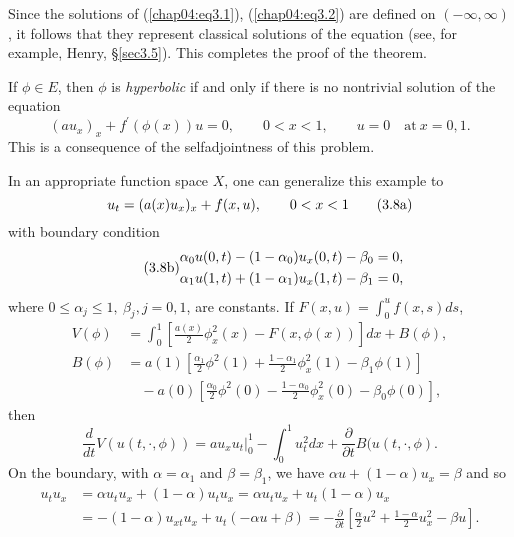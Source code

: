 \documentclass{surv-l}
\theoremstyle{plain}
\theoremstyle{definition}
\numberwithin{equation}{section}
\numberwithin{figure}{chapter}
\begin{document}
Since the solutions of (\ref{chap04:eq3.1}), (\ref{chap04:eq3.2}) are defined on $(-\infty, \infty)$, it follows that they represent classical solutions of the equation (see, for example, Henry, \S\ref{sec3.5}). This completes the proof of the theorem.

If $\phi \in E$, then $\phi$ is \emph{hyperbolic} if and only if there is no nontrivial solution of the equation
\begin{equation*}
(au_{x})_{x}+f^{\prime}(\phi(x))u=0,\qquad 0<x<1,\qquad u=0\quad \mathrm{at}\ x=0,1.
\end{equation*}
This is a consequence of the selfadjointness of this problem.

In an appropriate function space $X$, one can generalize this example to
\begin{equation}\label{chap04:eq3.8a}
u_{t}=(a(x)u_{x})_{x}+f(x, u),\qquad 0<x<1\tag{$3.8\mathrm{a}$}
\end{equation}
with boundary condition
\begin{equation}\label{chap04:eq3.8b}\tag{$3.8\mathrm{b}$}
\begin{split}
&\alpha_{0}u(0, t)-(1-\alpha_{0})u_{x}(0, t)-\beta_{0}=0,\\
&\alpha_{1}u(1, t)+(1-\alpha_{1})u_{x}(1, t)-\beta_{1}=0,
\end{split}
\end{equation}
where $0\leq\alpha_{j}\leq 1,\ \beta_{j},j=0,1$, are constants. If
$F(x, u)=\int_{0}^{u}f(x, s) ds$,
\begin{align*}
V(\phi)&=\int_{0}^{1}\left[\frac{a(x)}{2}\phi_{x}^{2}(x)-F(x, \phi(x))\right]dx+B(\phi),\\
B(\phi)&=a(1)\left[\frac{\alpha_{1}}{2}\phi^{2}(1)+\frac{1-\alpha_{1}}{2}\phi_{x}^{2}(1)-\beta_{1}\phi(1)\right]\\
&\quad-a(0)\left[\frac{\alpha_{0}}{2}\phi^{2}(0)-\frac{1-\alpha_{0}}{2}\phi_{x}^{2}(0)-\beta_{0}\phi(0)\right],
\end{align*}
then
\begin{equation*}
\frac{d}{dt}V(u(t, \cdot, \phi))=au_{x}u_{t}|_{0}^{1}-\int_{0}^{1}u_{t}^{2}dx+\frac{\partial}{\partial t}B(u(t, \cdot, \phi).
\end{equation*}
On the boundary, with $\alpha=\alpha_{1}$ and $\beta=\beta_{1}$, we have $\alpha u+(1-\alpha)u_{x}=\beta$ and so
\begin{align*}
u_{t}u_{x}&=\alpha u_{t}u_{x}+(1-\alpha)u_{t}u_{x}=\alpha u_{t}u_{x}+u_{t}(1-\alpha)u_{x}\\
\quad&=-(1-\alpha)u_{xt}u_{x}+u_{t}(-\alpha u+\beta)=-\frac{\partial}{\partial t}\left[\frac{\alpha}{2}u^{2}+\frac{1-\alpha}{2}u_{x}^{2}-\beta u \right].
\end{align*}
\end{document}
